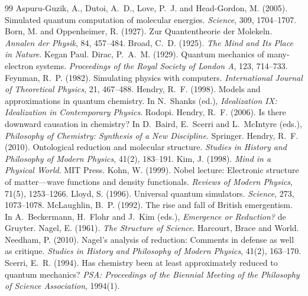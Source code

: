 \documentclass{situationist-preprint}
\begin{document}
\begin{thebibliography}{99}\small
{} Aspuru-Guzik, A., Dutoi, A.~D., Love, P.~J. and Head-Gordon, M. (2005). Simulated quantum computation of molecular energies. \emph{Science}, 309, 1704--1707.
 Born, M. and Oppenheimer, R. (1927). Zur Quantentheorie der Molekeln. \emph{Annalen der Physik}, 84, 457--484.
 Broad, C.~D. (1925). \emph{The Mind and Its Place in Nature}. Kegan Paul.
 Dirac, P.~A.~M. (1929). Quantum mechanics of many-electron systems. \emph{Proceedings of the Royal Society of London A}, 123, 714--733.
 Feynman, R.~P. (1982). Simulating physics with computers. \emph{International Journal of Theoretical Physics}, 21, 467--488.
 Hendry, R.~F. (1998). Models and approximations in quantum chemistry. In N.~Shanks (ed.), \emph{Idealization IX: Idealization in Contemporary Physics}. Rodopi.
 Hendry, R.~F. (2006). Is there downward causation in chemistry? In D.~Baird, E.~Scerri and L.~McIntyre (eds.), \emph{Philosophy of Chemistry: Synthesis of a New Discipline}. Springer.
 Hendry, R.~F. (2010). Ontological reduction and molecular structure. \emph{Studies in History and Philosophy of Modern Physics}, 41(2), 183--191.
 Kim, J. (1998). \emph{Mind in a Physical World}. MIT Press.
 Kohn, W. (1999). Nobel lecture: Electronic structure of matter---wave functions and density functionals. \emph{Reviews of Modern Physics}, 71(5), 1253--1266.
 Lloyd, S. (1996). Universal quantum simulators. \emph{Science}, 273, 1073--1078.
 McLaughlin, B.~P. (1992). The rise and fall of British emergentism. In A.~Beckermann, H.~Flohr and J.~Kim (eds.), \emph{Emergence or Reduction?} de Gruyter.
 Nagel, E. (1961). \emph{The Structure of Science}. Harcourt, Brace and World.
 Needham, P. (2010). Nagel's analysis of reduction: Comments in defense as well as critique. \emph{Studies in History and Philosophy of Modern Physics}, 41(2), 163--170.
 Scerri, E.~R. (1994). Has chemistry been at least approximately reduced to quantum mechanics? \emph{PSA: Proceedings of the Biennial Meeting of the Philosophy of Science Association}, 1994(1).

\end{thebibliography}
\end{document}
